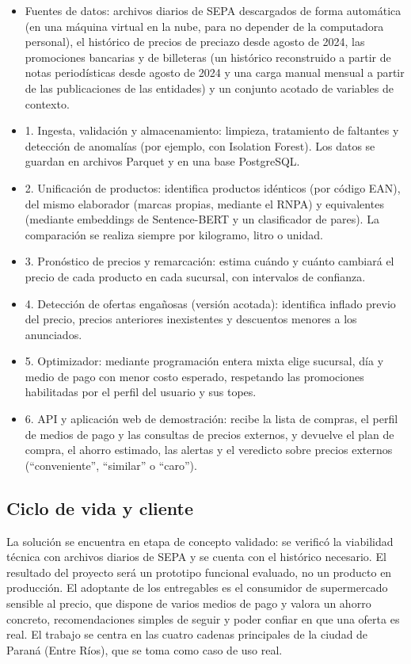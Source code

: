 \documentclass[
11pt, %
]{charter}
\begin{document}
\begin{itemize}
	\item Fuentes de datos: archivos diarios de SEPA descargados de forma automática (en una máquina virtual en la nube, para no depender de la computadora personal), el histórico de precios de preciazo desde agosto de 2024, las promociones bancarias y de billeteras (un histórico reconstruido a partir de notas periodísticas desde agosto de 2024 y una carga manual mensual a partir de las publicaciones de las entidades) y un conjunto acotado de variables de contexto.
	\item 1. Ingesta, validación y almacenamiento: limpieza, tratamiento de faltantes y detección de anomalías (por ejemplo, con Isolation Forest). Los datos se guardan en archivos Parquet y en una base PostgreSQL.
	\item 2. Unificación de productos: identifica productos idénticos (por código EAN), del mismo elaborador (marcas propias, mediante el RNPA) y equivalentes (mediante embeddings de Sentence-BERT y un clasificador de pares). La comparación se realiza siempre por kilogramo, litro o unidad.
	\item 3. Pronóstico de precios y remarcación: estima cuándo y cuánto cambiará el precio de cada producto en cada sucursal, con intervalos de confianza.
	\item 4. Detección de ofertas engañosas (versión acotada): identifica inflado previo del precio, precios anteriores inexistentes y descuentos menores a los anunciados.
	\item 5. Optimizador: mediante programación entera mixta elige sucursal, día y medio de pago con menor costo esperado, respetando las promociones habilitadas por el perfil del usuario y sus topes.
	\item 6. API y aplicación web de demostración: recibe la lista de compras, el perfil de medios de pago y las consultas de precios externos, y devuelve el plan de compra, el ahorro estimado, las alertas y el veredicto sobre precios externos (``conveniente'', ``similar'' o ``caro'').
\end{itemize}

\subsection{Ciclo de vida y cliente}

La solución se encuentra en etapa de concepto validado: se verificó la viabilidad técnica con archivos diarios de SEPA y se cuenta con el histórico necesario. El resultado del proyecto será un prototipo funcional evaluado, no un producto en producción. El adoptante de los entregables es el consumidor de supermercado sensible al precio, que dispone de varios medios de pago y valora un ahorro concreto, recomendaciones simples de seguir y poder confiar en que una oferta es real. El trabajo se centra en las cuatro cadenas principales de la ciudad de Paraná (Entre Ríos), que se toma como caso de uso real.
\end{document}
